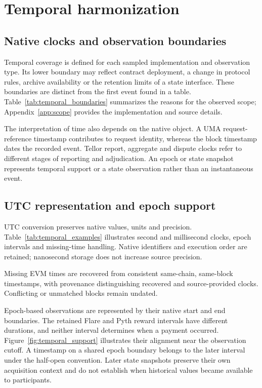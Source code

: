\clearpage
\section{Temporal harmonization}
\label{app:temporal}

\subsection{Native clocks and observation boundaries}

Temporal coverage is defined for each sampled implementation and observation type. Its lower boundary may reflect contract deployment, a change in protocol rules, archive availability or the retention limits of a state interface. These boundaries are distinct from the first event found in a table. Table~\ref{tab:temporal_boundaries} summarizes the reasons for the observed scope; Appendix~\ref{app:scope} provides the implementation and source details.



The interpretation of time also depends on the native object. A UMA request-reference timestamp contributes to request identity, whereas the block timestamp dates the recorded event. Tellor report, aggregate and dispute clocks refer to different stages of reporting and adjudication. An epoch or state snapshot represents temporal support or a state observation rather than an instantaneous event.

\subsection{UTC representation and epoch support}

UTC conversion preserves native values, units and precision. Table~\ref{tab:temporal_examples} illustrates second and millisecond clocks, epoch intervals and missing-time handling. Native identifiers and execution order are retained; nanosecond storage does not increase source precision.

Missing EVM times are recovered from consistent same-chain, same-block timestamps, with provenance distinguishing recovered and source-provided clocks. Conflicting or unmatched blocks remain undated.



Epoch-based observations are represented by their native start and end boundaries. The retained Flare and Pyth reward intervals have different durations, and neither interval determines when a payment occurred. Figure~\ref{fig:temporal_support} illustrates their alignment near the observation cutoff. A timestamp on a shared epoch boundary belongs to the later interval under the half-open convention. Later state snapshots preserve their own acquisition context and do not establish when historical values became available to participants.


